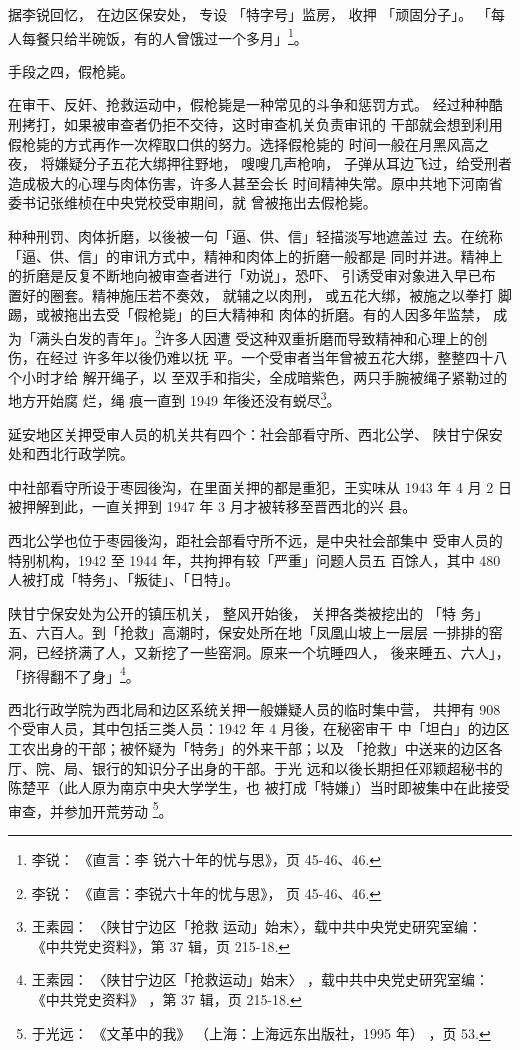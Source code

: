 据李锐回忆， 在边区保安处， 专设 「特字号」监房， 收押 「顽固分子」。
「每人每餐只给半碗饭，有的人曾饿过一个多月」\footnote{李锐： 《直言：李
锐六十年的忧与思》，页 45-46、46.}。

手段之四，假枪毙。

在审干、反奸、抢救运动中，假枪毙是一种常见的斗争和惩罚方式。
经过种种酷刑拷打，如果被审查者仍拒不交待，这时审查机关负责审讯的
干部就会想到利用假枪毙的方式再作一次榨取口供的努力。选择假枪毙的
时间一般在月黑风高之夜，
将嫌疑分子五花大绑押往野地，
嗖嗖几声枪响，
子弹从耳边飞过，给受刑者造成极大的心理与肉体伤害，许多人甚至会长
时间精神失常。原中共地下河南省委书记张维桢在中央党校受审期间，就
曾被拖出去假枪毙。

种种刑罚、肉体折磨，以後被一句「逼、供、信」轻描淡写地遮盖过 去。在统称
「逼、供、信」的审讯方式中，精神和肉体上的折磨一般都是 同时并进。精神上
的折磨是反复不断地向被审查者进行「劝说」，恐吓、 引诱受审对象进入早已布
置好的圈套。精神施压若不奏效， 就辅之以肉刑， 或五花大绑，被施之以拳打
脚踢，或被拖出去受「假枪毙」的巨大精神和 肉体的折磨。有的人因多年监禁，
成为「满头白发的青年」。\footnote{李锐： 《直言：李锐六十年的忧与思》，
页 45-46、46.}许多人因遭 受这种双重折磨而导致精神和心理上的创伤，在经过
许多年以後仍难以抚 平。一个受审者当年曾被五花大绑，整整四十八个小时才给
解开绳子，以 至双手和指尖，全成暗紫色，两只手腕被绳子紧勒过的地方开始腐
烂，绳 痕一直到 1949 年後还没有蜕尽\footnote{王素园： 〈陕甘宁边区「抢救
运动」始末〉，载中共中央党史研究室编： 《中共党史资料》，第 37 辑，页
215-18.}。

延安地区关押受审人员的机关共有四个：社会部看守所、西北公学、
陕甘宁保安处和西北行政学院。

中社部看守所设于枣园後沟，在里面关押的都是重犯，王实味从 1943
年 4 月 2 日被押解到此，一直关押到 1947 年 3 月才被转移至晋西北的兴
县。

西北公学也位于枣园後沟，距社会部看守所不远，是中央社会部集中
受审人员的特别机构，1942 至 1944 年，共拘押有较「严重」问题人员五
百馀人，其中 480 人被打成「特务」、「叛徒」、「日特」。
 
陕甘宁保安处为公开的镇压机关，
整风开始後，
关押各类被挖出的
「特
务」五、六百人。到「抢救」高潮时，保安处所在地「凤凰山坡上一层层
一排排的窑洞，已经挤满了人，又新挖了一些窑洞。原来一个坑睡四人，
後来睡五、六人」，「挤得翻不了身」\footnote{王素园：
〈陕甘宁边区「抢救运动」始末〉
，载中共中央党史研究室编：
《中共党史资料》
，第 37 辑，页 215-18.}。

西北行政学院为西北局和边区系统关押一般嫌疑人员的临时集中营，
共押有 908 个受审人员，其中包括三类人员：1942 年 4 月後，在秘密审干
中「坦白」的边区工农出身的干部；被怀疑为「特务」的外来干部；以及
「抢救」中送来的边区各厅、院、局、银行的知识分子出身的干部。于光
远和以後长期担任邓颖超秘书的陈楚平（此人原为南京中央大学学生，也
被打成「特嫌」）当时即被集中在此接受审查，并参加开荒劳动
\footnote{于光远：
《文革中的我》
（上海：上海远东出版社，1995 年）
，页 53.}。

